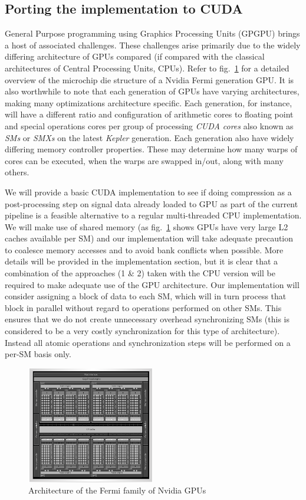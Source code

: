 \documentclass{acm_proc_article-sp}
\begin{document}
\subsection{Porting the implementation to CUDA}
General Purpose programming using Graphics Processing Units (GPGPU) brings a host of associated challenges. These challenges arise primarily due to the widely differing architecture of GPUs compared (if compared
with the classical architectures of Central Processing Units, CPUs). Refer to fig.~\ref{FERMI_ARCH} for a detailed overview of the microchip die structure of a Nvidia Fermi generation GPU. It is also worthwhile to note 
that each generation of GPUs have varying architectures, making many optimizations architecture specific. Each generation, for instance, will have a different ratio and configuration of arithmetic cores to floating point
and special operations cores per group of processing \textit{CUDA cores} also known as \textit{SMs} or \textit{SMXs} on the latest \textit{Kepler} generation. Each generation also have widely differing memory 
controller properties. These may determine how many warps of cores can be executed, when the warps are swapped in/out, along with many others. 

We will provide a basic CUDA implementation to see if doing compression as a post-processing step on signal data already loaded to GPU as part of the current pipeline is a feasible alternative to a regular 
multi-threaded CPU implementation. We will make use of shared memory (as fig.~\ref{FERMI_ARCH} shows GPUs have very large L2 caches available per SM) and our implementation will take adequate precaution to 
coalesce memory accesses and to avoid bank conflicts when possible. More details will be provided in the implementation section, but it is clear that a combination of the approaches (1 \& 2) taken with the CPU version 
will be required to make adequate use of the GPU architecture. Our implementation will consider assigning a block of data to each SM, which will in turn process that block in parallel without regard to operations 
performed on other SMs. This ensures that we do not create unnecessary overhead synchronizing SMs (this is considered to be a very costly synchronization for this type of architecture). Instead all atomic operations 
and synchronization steps will be performed on a per-SM basis only.
\begin{figure}[h!]
 \centering
 \includegraphics[width=0.50\textwidth]{fermi_arch.png}
 \caption{Architecture of the Fermi family of Nvidia GPUs \cite{wittenbrink2011fermi}}
 \label{FERMI_ARCH}
\end{figure}
\end{document}
